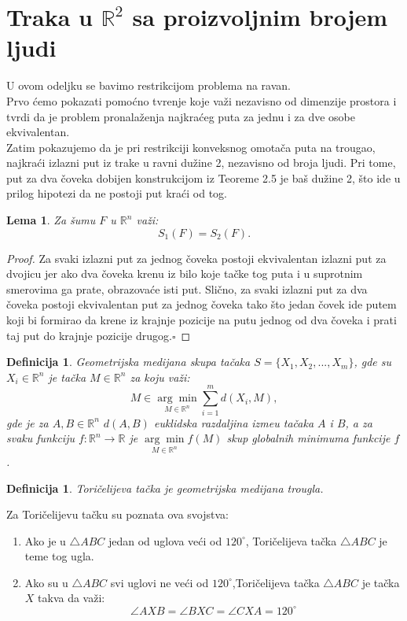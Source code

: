 \documentclass[11pt,letter]{article}
\newtheorem{lem}[teo]{\bf Lema}
\newtheorem{df}[teo]{\bf Definicija}
\newcommand{\qed}{\hfill $\square$ \bigskip}
\begin{document}
\section[Traka u $\mathbb{R}^2$ sa proizvoljnim brojem ljudi]{Traka u $\mathbb{R}^2$ sa proizvoljnim brojem ljudi}

U ovom odeljku se bavimo restrikcijom problema na ravan.
\\
\indent Prvo \' cemo pokazati pomo\' cno tvr\dj enje koje va\v zi nezavisno od dimenzije prostora i tvrdi da je problem pronala\v zenja najkra\' ceg puta za jednu i za dve osobe ekvivalentan. 
\\
\indent Zatim pokazujemo da je pri restrikciji konveksnog omota\v ca puta na trougao, najkra\' ci izlazni put iz trake u ravni du\v zine 2, nezavisno od broja ljudi. Pri tome, put za dva \v coveka dobijen konstrukcijom iz Teoreme 2.5 je ba\v s du\v zine 2, \v sto ide u prilog hipotezi da ne postoji put kra\' ci od tog.
 
\bigskip
\begin{lem} Za \v sumu $F$ u $\mathbb{R}^n$ va\v zi: $$S_1(F)=S_2(F).$$\end{lem}

\begin{proof}Za svaki izlazni put za jednog \v coveka postoji ekvivalentan izlazni put za dvojicu jer ako dva \v coveka krenu iz bilo koje ta\v cke tog puta i u suprotnim smerovima ga prate, obrazova\' ce isti put. Sli\v cno, za svaki izlazni put za dva \v coveka postoji ekvivalentan put za jednog \v coveka tako \v sto jedan \v covek ide putem koji bi formirao da krene iz krajnje pozicije na putu jednog od dva \v coveka i prati taj put do krajnje pozicije drugog.\qed
\end{proof}
\begin{df} Geometrijska medijana skupa ta\v caka $S=\{ X_1, X_2, ..., X_m\}$, gde su $X_i\in \mathbb{R}^n$ je ta\v cka $M\in \mathbb{R}^n$ za koju va\v zi:
$$M\in \underset{M\in \mathbb{R}^n}{\arg\min} \sum^m_{i=1}{d(X_i, M)}, $$
gde je za $A,B\in \mathbb{R}^n$ $d(A, B)$ euklidska razdaljina izme\dj u ta\v caka $A$ i $B$, a za svaku funkciju $f: \mathbb{R}^n\to \mathbb{R}$ je $\underset{M\in \mathbb{R}^n}{\arg\min} f(M)$ skup globalnih minimuma funkcije $f$. \end{df}
\begin{df} Tori\v celijeva ta\v cka je geometrijska medijana trougla. \end{df}
\indent Za Tori\v celijevu ta\v cku su poznata ova svojstva:
\begin{enumerate}
\item Ako je u $\bigtriangleup ABC$ jedan od uglova ve\' ci od $120^\circ$, Tori\v celijeva ta\v cka $\bigtriangleup ABC$ je teme tog ugla.
\item Ako su u $\bigtriangleup ABC$ svi uglovi ne ve\' ci od $120^\circ$,Tori\v celijeva ta\v cka $\bigtriangleup ABC$ je ta\v cka $X$ takva da va\v zi:
$$\angle AXB=\angle BXC= \angle CXA=120^\circ$$
\end{enumerate}
\end{document}
